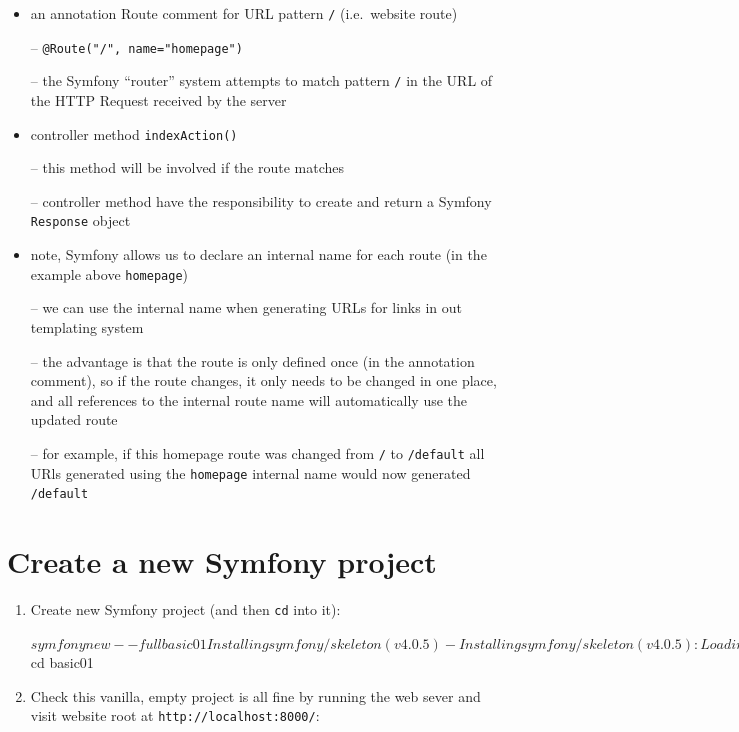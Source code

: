 \documentclass[a4paperpaper,openright]{book}
\newenvironment{Shaded}{}{}
\newcommand{\BuiltInTok}[1]{#1}
\newcommand{\ExtensionTok}[1]{#1}
\newcommand{\NormalTok}[1]{#1}
\begin{document}
\begin{itemize}
\item
  an annotation Route comment for URL pattern \texttt{/} (i.e.~website
  route)

  -- \texttt{@Route("/",\ name="homepage")}

  -- the Symfony ``router'' system attempts to match pattern \texttt{/}
  in the URL of the HTTP Request received by the server
\item
  controller method \texttt{indexAction()}

  -- this method will be involved if the route matches

  -- controller method have the responsibility to create and return a
  Symfony \texttt{Response} object
\item
  note, Symfony allows us to declare an internal name for each route (in
  the example above \texttt{homepage})

  -- we can use the internal name when generating URLs for links in out
  templating system

  -- the advantage is that the route is only defined once (in the
  annotation comment), so if the route changes, it only needs to be
  changed in one place, and all references to the internal route name
  will automatically use the updated route

  -- for example, if this homepage route was changed from \texttt{/} to
  \texttt{/default} all URls generated using the \texttt{homepage}
  internal name would now generated \texttt{/default}
\end{itemize}

\hypertarget{create-a-new-symfony-project}{%
\section{Create a new Symfony
project}\label{create-a-new-symfony-project}}

\begin{enumerate}
\def\labelenumi{\arabic{enumi}.}
\item
  Create new Symfony project (and then \texttt{cd} into it):

\begin{Shaded}
\begin{Highlighting}[]
\NormalTok{    $ }\ExtensionTok{symfony}\NormalTok{ new --full basic01}
    \ExtensionTok{Installing}\NormalTok{ symfony/skeleton (v4.0.5)}
      \ExtensionTok{-}\NormalTok{ Installing symfony/skeleton (v4.0.5)}\BuiltInTok{:}\NormalTok{ Loading from cache}

    \ExtensionTok{...}\NormalTok{ etc. ...}

\NormalTok{    $ }\BuiltInTok{cd}\NormalTok{ basic01}
\end{Highlighting}
\end{Shaded}
\item
  Check this vanilla, empty project is all fine by running the web sever
  and visit website root at \texttt{http://localhost:8000/}:
\end{enumerate}
\end{document}
